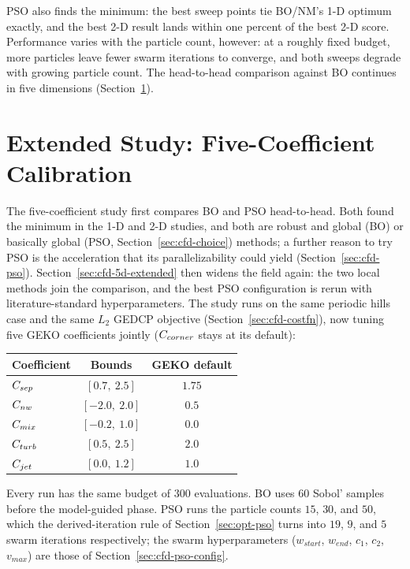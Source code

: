 PSO also finds the minimum: the best sweep points tie BO/NM's 1-D optimum
exactly, and the best 2-D result lands within one percent of the best 2-D
score.  Performance varies with the particle count, however: at a roughly
fixed budget, more particles leave fewer swarm iterations to converge, and
both sweeps degrade with growing particle count.  The head-to-head
comparison against BO continues in five dimensions
(Section~\ref{sec:cfd-5d}).

\section{Extended Study: Five-Coefficient Calibration}
\label{sec:cfd-5d}

The five-coefficient study first compares BO and PSO head-to-head.  Both
found the minimum in the 1-D and 2-D studies, and both are robust and
global (BO) or basically global (PSO, Section~\ref{sec:cfd-choice})
methods; a further reason to try PSO is the acceleration that its
parallelizability could yield (Section~\ref{sec:cfd-pso}).
Section~\ref{sec:cfd-5d-extended} then widens the field again: the two
local methods join the comparison, and the best PSO configuration is
rerun with literature-standard hyperparameters.  The study runs on the same
periodic hills case and the same $L_2$ GEDCP objective
(Section~\ref{sec:cfd-costfn}), now tuning five GEKO coefficients jointly
($C_{corner}$ stays at its default):

\begin{center}
\begin{tabular}{@{}lcc@{}}
\toprule
Coefficient & Bounds & GEKO default \\
\midrule
$C_{sep}$  & $[0.7,\ 2.5]$  & $1.75$ \\
$C_{nw}$   & $[-2.0,\ 2.0]$ & $0.5$  \\
$C_{mix}$  & $[-0.2,\ 1.0]$ & $0.0$  \\
$C_{turb}$ & $[0.5,\ 2.5]$  & $2.0$  \\
$C_{jet}$  & $[0.0,\ 1.2]$  & $1.0$  \\
\bottomrule
\end{tabular}
\end{center}

Every run has the same budget of $300$ evaluations.  BO uses $60$ Sobol'
samples before the model-guided phase.  PSO runs the particle counts $15$,
$30$, and $50$, which the derived-iteration rule of
Section~\ref{sec:opt-pso} turns into $19$, $9$, and $5$ swarm iterations
respectively; the swarm hyperparameters ($w_{start}$, $w_{end}$, $c_1$,
$c_2$, $v_{max}$) are those of Section~\ref{sec:cfd-pso-config}.

